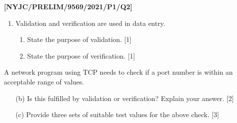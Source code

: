 \item \textbf{{[}NYJC/PRELIM/9569/2021/P1/Q2{]} }
\begin{enumerate}
\item Validation and verification are used in data entry. 
\begin{enumerate}
\item State the purpose of validation. \hfill{}{[}1{]}
\item State the purpose of verification. \hfill{}{[}1{]}
\end{enumerate}
\end{enumerate}
A network program using TCP needs to check if a port number is within
an acceptable range of values.
\begin{enumerate}
\item[(b)]  Is this fulfilled by validation or verification? Explain your answer.\hfill{}
{[}2{]}
\item[(c)]  Provide three sets of suitable test values for the above check.
\hfill{}{[}3{]}
\end{enumerate}